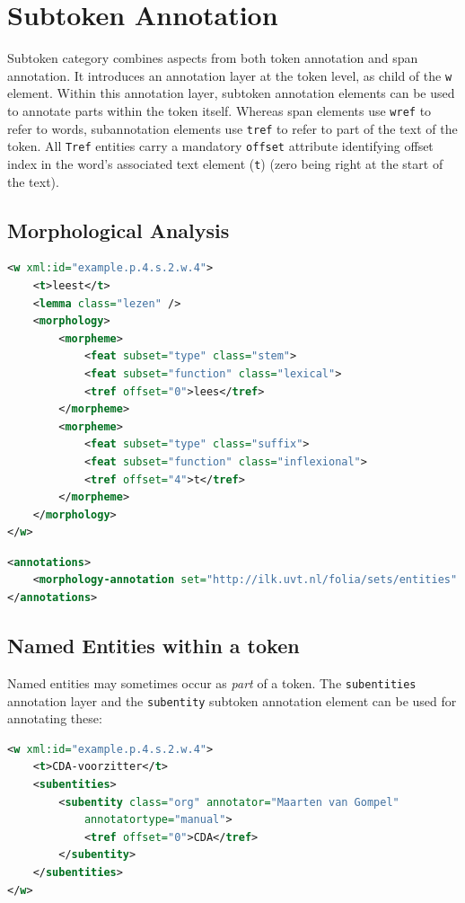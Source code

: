 \documentclass[a4paper,12pt]{report}
\begin{document}
\section{Subtoken Annotation}

Subtoken category combines aspects from both token annotation and span annotation. It introduces an annotation layer at the token level, as child of the \texttt{w} element. Within this annotation layer, subtoken annotation elements can be used to annotate parts within the token itself. Whereas span elements use \texttt{wref} to refer to words, subannotation elements use \texttt{tref} to refer to part of the text of the token. All \texttt{Tref} entities carry a mandatory \texttt{offset} attribute identifying offset index in the word's associated text element (\texttt{t}) (zero being right at the start of the text).

\subsection{Morphological Analysis}


\begin{lstlisting}[language=xml]
<w xml:id="example.p.4.s.2.w.4">
    <t>leest</t>
    <lemma class="lezen" />
    <morphology>
        <morpheme>
            <feat subset="type" class="stem">
            <feat subset="function" class="lexical">
            <tref offset="0">lees</tref>
        </morpheme>
        <morpheme>
            <feat subset="type" class="suffix">
            <feat subset="function" class="inflexional">
            <tref offset="4">t</tref>
        </morpheme>
    </morphology>
</w>
\end{lstlisting}


\begin{lstlisting}[language=xml]
<annotations>
    <morphology-annotation set="http://ilk.uvt.nl/folia/sets/entities" />
</annotations>
\end{lstlisting}

\subsection{Named Entities within a token}

Named entities may sometimes occur as \emph{part} of a token. The \texttt{subentities} annotation layer and the \texttt{subentity} subtoken annotation element can be used for annotating these:  

\begin{lstlisting}[language=xml]
<w xml:id="example.p.4.s.2.w.4">
    <t>CDA-voorzitter</t>
    <subentities>
        <subentity class="org" annotator="Maarten van Gompel"
            annotatortype="manual">
            <tref offset="0">CDA</tref>
        </subentity>
    </subentities>
</w>
\end{lstlisting}
\end{document}
